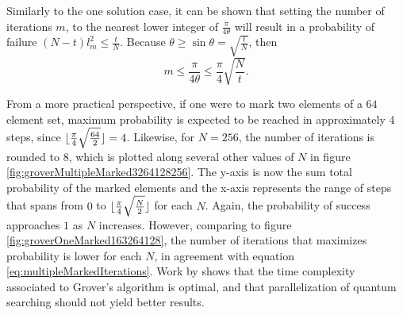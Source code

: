 \documentclass[../../dissertation.tex]{subfiles}
\begin{document}
Similarly to the one solution case, it can be shown that setting the number of
iterations $m$, to the nearest lower integer of $\frac{\pi}{4\theta}$ will
result in a probability of failure $(N-t)l^2_m \leq \frac{t}{N}$. Because
$\theta \geq \sin\theta = \sqrt{\frac{t}{N}}$, then
\begin{equation}
	m \leq \frac{\pi}{4\theta} \leq \frac{\pi}{4}\sqrt{\frac{N}{t}}.
	\label{eq:multipleMarkedIterations}
\end{equation}\par
From a more practical perspective, if one were to mark two elements of a $64$
element set, maximum probability is expected to be reached in approximately 4
steps, since $\lfloor\frac{\pi}{4}\sqrt{\frac{64}{2}}\rfloor = 4$. Likewise, for
$N=256$, the number of iterations is rounded to $8$, which is plotted along
several other values of $N$ in figure \ref{fig:groverMultipleMarked3264128256}.
The y-axis is now the sum total probability of the marked elements and the
x-axis represents the range of steps that spans from $0$ to
$\lfloor\frac{\pi}{4}\sqrt{\frac{N}{2}}\rfloor$ for each $N$.
Again, the probability of success approaches $1$ as $N$ increases. However,
comparing to figure \ref{fig:groverOneMarked163264128}, the number of
iterations that maximizes probability is lower for each $N$, in agreement with
equation \eqref{eq:multipleMarkedIterations}. Work by \cite{zalka1999} shows that
the time complexity associated to Grover's algorithm is optimal, and that
parallelization of quantum searching should not yield better results.
\end{document}
